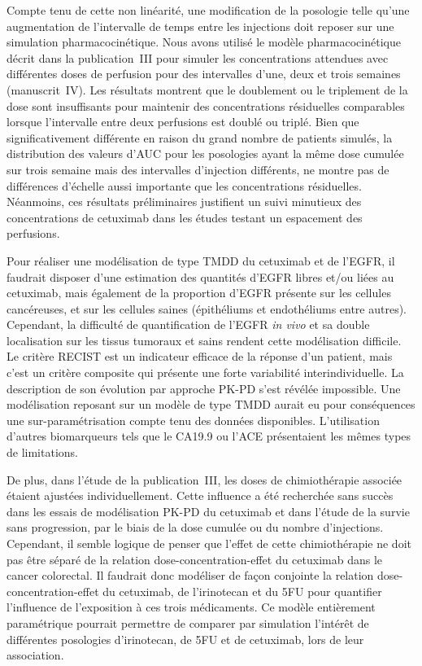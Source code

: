 Compte tenu de cette non linéarité, une modification de la posologie telle qu'une augmentation de l'intervalle de temps entre les injections doit reposer sur une simulation pharmacocinétique. Nous avons utilisé le modèle pharmacocinétique décrit dans la publication~III pour simuler les concentrations attendues avec différentes doses de perfusion pour des intervalles d'une, deux et trois semaines (manuscrit~IV). Les résultats montrent que le doublement ou le triplement de la dose sont insuffisants pour maintenir des concentrations résiduelles comparables lorsque l'intervalle entre deux perfusions est doublé ou triplé. Bien que significativement différente en raison du grand nombre de patients simulés, la distribution des valeurs d'\gls{AUC} pour les posologies ayant la même dose cumulée sur trois semaine mais des intervalles d'injection différents, ne montre pas de différences d'échelle aussi importante que les concentrations résiduelles. Néanmoins, ces résultats préliminaires justifient un suivi minutieux des concentrations de cetuximab dans les études testant un espacement des perfusions.  

Pour réaliser une modélisation de type TMDD du cetuximab et de l'EGFR, il faudrait disposer d'une estimation des quantités d'EGFR libres et/ou liées au cetuximab, mais également de la proportion d'EGFR présente sur les cellules cancéreuses, et sur les cellules saines (épithéliums et endothéliums entre autres). Cependant, la difficulté de quantification de l'EGFR \textit{in vivo} et sa double localisation sur les tissus tumoraux et sains rendent cette modélisation difficile. Le critère RECIST est un indicateur efficace de la réponse d'un patient, mais c'est un critère composite qui présente une forte variabilité interindividuelle. La description de son évolution par approche PK-PD s'est révélée impossible. Une modélisation reposant sur un modèle de type TMDD aurait eu pour conséquences une sur-paramétrisation compte tenu des données disponibles. L'utilisation d'autres biomarqueurs tels que le CA19.9 ou l'ACE présentaient les mêmes types de limitations. 

De plus, dans l'étude de la publication~III, les doses de chimiothérapie associée étaient ajustées individuellement. Cette influence a été recherchée sans succès dans les essais de modélisation PK-PD du cetuximab et dans l'étude de la survie sans progression, par le biais de la dose cumulée ou du nombre d'injections. Cependant, il semble logique de penser que l'effet de cette chimiothérapie ne doit pas être séparé de la relation dose-concentration-effet du cetuximab dans le cancer colorectal. Il faudrait donc modéliser de façon conjointe la relation dose-concentration-effet du cetuximab, de l'irinotecan et du \gls{5FU} pour quantifier l'influence de l'exposition à ces trois médicaments. Ce modèle entièrement paramétrique pourrait permettre de comparer par simulation l'intérêt de différentes posologies d'irinotecan, de \gls{5FU} et de cetuximab, lors de leur association. 

